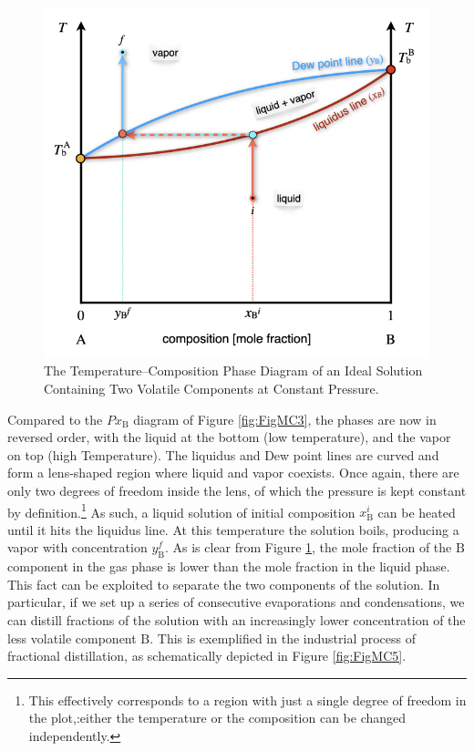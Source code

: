 \documentclass[
  9pt,
]{extbook}
\theoremstyle{definition}
\theoremstyle{definition}
\theoremstyle{definition}
\theoremstyle{remark}
\begin{document}
\begin{figure}

{\centering \includegraphics[width=0.6\linewidth]{./img/OEP_Figures.022} 

}

\caption{The Temperature–Composition Phase Diagram of an Ideal Solution Containing Two Volatile Components at Constant Pressure.}\label{fig:FigMC4}
\end{figure}

Compared to the \(Px_{\text{B}}\) diagram of Figure \ref{fig:FigMC3}, the phases are now in reversed order, with the liquid at the bottom (low temperature), and the vapor on top (high Temperature). The liquidus and Dew point lines are curved and form a lens-shaped region where liquid and vapor coexists. Once again, there are only two degrees of freedom inside the lens, of which the pressure is kept constant by definition.\footnote{This effectively corresponds to a region with just a single degree of freedom in the plot,:either the temperature or the composition can be changed independently.} As such, a liquid solution of initial composition \(x_{\text{B}}^i\) can be heated until it hits the liquidus line. At this temperature the solution boils, producing a vapor with concentration \(y_{\text{B}}^f\). As is clear from Figure \ref{fig:FigMC4}, the mole fraction of the \(\text{B}\) component in the gas phase is lower than the mole fraction in the liquid phase. This fact can be exploited to separate the two components of the solution. In particular, if we set up a series of consecutive evaporations and condensations, we can distill fractions of the solution with an increasingly lower concentration of the less volatile component \(\text{B}\). This is exemplified in the industrial process of fractional distillation, as schematically depicted in Figure \ref{fig:FigMC5}.
\end{document}
